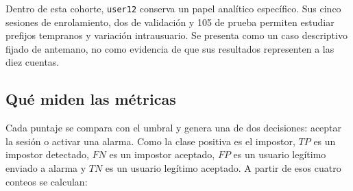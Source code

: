 \documentclass[11pt,letterpaper]{article}
\begin{document}
Dentro de esta cohorte, \texttt{user12} conserva un papel analítico específico. Sus cinco sesiones de enrolamiento,
dos de validación y 105 de prueba permiten estudiar prefijos tempranos y variación intrausuario. Se presenta como un
caso descriptivo fijado de antemano, no como evidencia de que sus resultados representen a las diez cuentas.

\subsection{Qué miden las métricas}
\label{sec:metricas}

Cada puntaje se compara con el umbral y genera una de dos decisiones: aceptar la sesión o activar una alarma. Como la
clase positiva es el impostor, $TP$ es un impostor detectado, $FN$ es un impostor aceptado, $FP$ es un usuario legítimo
enviado a alarma y $TN$ es un usuario legítimo aceptado. A partir de esos cuatro conteos se calculan:
\end{document}
